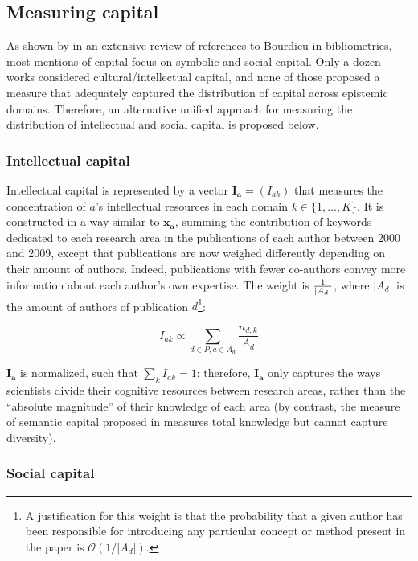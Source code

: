 \documentclass{article}
\begin{document}
\subsection{\label{sec:capital}Measuring capital}

As shown by \citet{Schirone2023} in an extensive review of references to Bourdieu in bibliometrics, most mentions of capital focus on symbolic and social capital. Only a dozen works considered cultural/intellectual capital, and none of those proposed a measure that adequately captured the distribution of capital across epistemic domains. Therefore, an alternative unified approach for measuring the distribution of intellectual and social capital is proposed below.

\subsubsection{Intellectual capital}

Intellectual capital is represented by a vector $\bm{I_a}=(I_{ak})$ that measures the concentration of $a$'s intellectual resources in each domain $k \in \{1,\dots,K\}$. It is constructed in a way similar to $\bm{x_{a}}$, summing the contribution of keywords dedicated to each research area in the publications of each author between 2000 and 2009, except that publications are now weighed differently depending on their amount of authors. Indeed, publications with fewer co-authors convey more information about each author's own expertise. The weight is $1 \over |A_d|$, where $|A_d|$ is the amount of authors of publication $d$\footnote{A justification for this weight is that the probability that a given author has been responsible for introducing any particular concept or method present in the paper is $\mathcal{O}(1/|A_d|)$. }:

\begin{equation}
    I_{ak} \propto  \sum_{d\in P,a\in A_d} \dfrac{n_{d,k}}{|A_d|}
\end{equation}

$\bm{I_a}$ is normalized, such that $\sum_k I_{ak}=1$; therefore, $\bm{I_a}$ only captures the ways scientists divide their cognitive resources between research areas, rather than the ``absolute magnitude'' of their knowledge of each area (by contrast, the measure of  semantic capital proposed in \citealt{Roth2010} measures total knowledge but cannot capture diversity).  

\subsubsection{Social capital}
\end{document}
